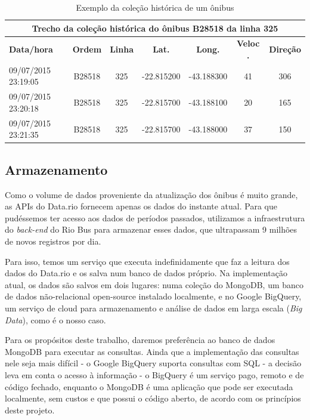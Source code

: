 \begin{table}[]
\centering
\caption{Exemplo da coleção histórica de um ônibus}
\label{table:collection_bus}
\begin{tabular}{|p{2.5cm}|c|c|c|c|c|c|}
\hline
\multicolumn{7}{|c|}{\textbf{Trecho da coleção histórica do ônibus B28518 da linha 325}} \\
\hline
\textbf{Data/hora} & \textbf{Ordem} & \textbf{Linha} & \textbf{Lat.} & \textbf{Long.} & \textbf{Veloc
.} & \textbf{Direção} \\ \hline
09/07/2015 23:19:05 & B28518 & 325 & -22.815200 & -43.188300 & 41 & 306\\\hline
09/07/2015 23:20:18 & B28518 & 325 & -22.815700 & -43.188100 & 20 & 165\\\hline
09/07/2015 23:21:35 & B28518 & 325 & -22.815700 & -43.188000 & 37 & 150\\\hline
\end{tabular}
\end{table}


\subsection{Armazenamento}

Como o volume de dados proveniente da atualização dos ônibus é muito grande, as APIs do Data.rio fornecem apenas os dados do instante atual. Para que pudéssemos ter acesso aos dados de períodos passados, utilizamos a infraestrutura do \textit{back-end} do Rio Bus para armazenar esses dados, que ultrapassam 9 milhões de novos registros por dia.

Para isso, temos um serviço que executa indefinidamente que faz a leitura dos dados do Data.rio e os salva num banco de dados próprio. Na implementação atual, os dados são salvos em dois lugares: numa coleção do MongoDB, um banco de dados não-relacional open-source instalado localmente, e no Google BigQuery, um serviço de cloud para armazenamento e análise de dados em larga escala (\textit{Big Data}), como é o nosso caso.

Para os propósitos deste trabalho, daremos preferência ao banco de dados MongoDB\cite{REF_MONGODB} para executar as consultas. Ainda que a implementação das consultas nele seja mais difícil - o Google BigQuery\cite{REF_BIGQUERY} suporta consultas com SQL - a decisão leva em conta o acesso à informação - o BigQuery é um serviço pago, remoto e de código fechado, enquanto o MongoDB é uma aplicação que pode ser executada localmente, sem custos e que possui o código aberto, de acordo com os princípios deste projeto.

